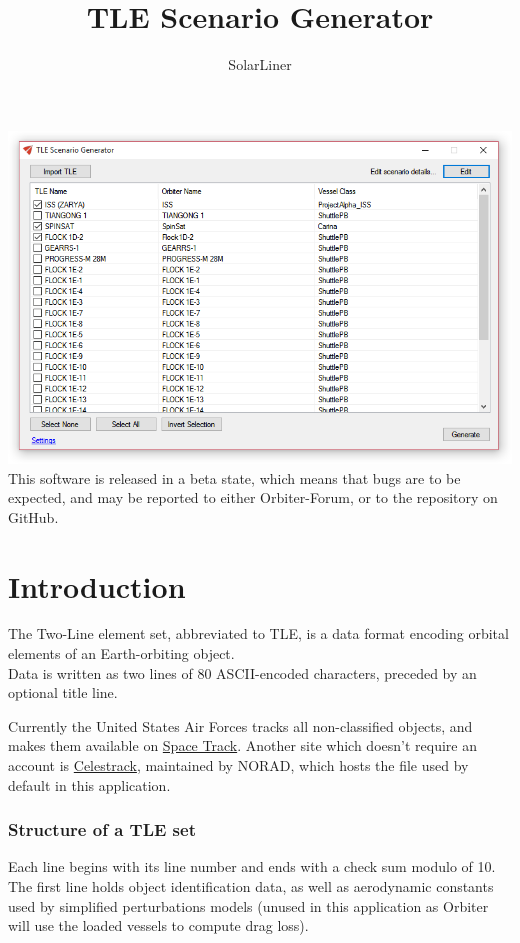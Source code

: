 \documentclass[a4paper]{article}
\title{TLE Scenario Generator}
\author{SolarLiner}
\begin{document}
	\maketitle
	\includegraphics[width=\linewidth]{mainwindow.png} 
	This software is released in a beta state, which means that bugs are to be expected, and may be reported to either Orbiter-Forum, or to the repository on GitHub.
	\newpage
	\tableofcontents
	\newpage
	
	\part{Introduction}
	The Two-Line element set, abbreviated to TLE, is a data format encoding orbital elements of an Earth-orbiting object.\\
	Data is written as two lines of 80 ASCII-encoded characters, preceded by an optional title line.
	
	Currently the United States Air Forces tracks all non-classified objects, and makes them available on \href{https://www.space-track.org/}{Space Track}. Another site which doesn't require an account is \href{https://celestrak.com/}{Celestrack}, maintained by NORAD, which hosts the file used by default in this application.
	\section{Structure of a TLE set}
		Each line begins with its line number and ends with a check sum modulo of 10.\\
		The first line holds object identification data, as well as aerodynamic constants used by simplified perturbations models (unused in this application as Orbiter will use the loaded vessels to compute drag loss).
		
\end{document}
